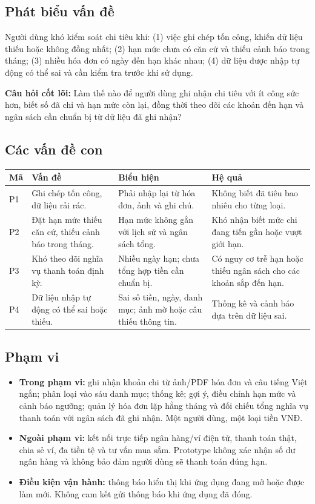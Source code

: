 \documentclass[11pt,a4paper]{article}
\newcommand{\thead}[1]{\rowcolor{tablehead}#1\\\midrule}
\begin{document}
\subsection{Phát biểu vấn đề}
Người dùng khó kiểm soát chi tiêu khi: (1) việc ghi chép tốn công, khiến dữ liệu thiếu hoặc không đồng nhất; (2) hạn mức chưa có căn cứ và thiếu cảnh báo trong tháng; (3) nhiều hóa đơn có ngày đến hạn khác nhau; (4) dữ liệu được nhập tự động có thể sai và cần kiểm tra trước khi sử dụng.

\textbf{Câu hỏi cốt lõi:} Làm thế nào để người dùng ghi nhận chi tiêu với ít công sức hơn, biết số đã chi và hạn mức còn lại, đồng thời theo dõi các khoản đến hạn và ngân sách cần chuẩn bị từ dữ liệu đã ghi nhận?

\subsection{Các vấn đề con}
\begin{longtable}{@{}P{.7cm}P{5.1cm}P{5.1cm}P{4.2cm}@{}}
\toprule\thead{\textbf{Mã}&\textbf{Vấn đề}&\textbf{Biểu hiện}&\textbf{Hệ quả}}
\endhead
P1&Ghi chép tốn công, dữ liệu rải rác.&Phải nhập lại từ hóa đơn, ảnh và ghi chú.&Không biết đã tiêu bao nhiêu cho từng loại.\\\midrule
P2&Đặt hạn mức thiếu căn cứ, thiếu cảnh báo trong tháng.&Hạn mức không gắn với lịch sử và ngân sách tổng.&Khó nhận biết mức chi đang tiến gần hoặc vượt giới hạn.\\\midrule
P3&Khó theo dõi nghĩa vụ thanh toán định kỳ.&Nhiều ngày hạn; chưa tổng hợp tiền cần chuẩn bị.&Có nguy cơ trễ hạn hoặc thiếu ngân sách cho các khoản sắp đến hạn.\\\midrule
P4&Dữ liệu nhập tự động có thể sai hoặc thiếu.&Sai số tiền, ngày, danh mục; ảnh mờ hoặc câu thiếu thông tin.&Thống kê và cảnh báo dựa trên dữ liệu sai.\\\bottomrule
\end{longtable}

\subsection{Phạm vi}
\begin{itemize}
\item \textbf{Trong phạm vi:} ghi nhận khoản chi từ ảnh/PDF hóa đơn và câu tiếng Việt ngắn; phân loại vào sáu danh mục; thống kê; gợi ý, điều chỉnh hạn mức và cảnh báo ngưỡng; quản lý hóa đơn lặp hằng tháng và đối chiếu tổng nghĩa vụ thanh toán với ngân sách đã ghi nhận. Một người dùng, một loại tiền VNĐ.
\item \textbf{Ngoài phạm vi:} kết nối trực tiếp ngân hàng/ví điện tử, thanh toán thật, chia sẻ ví, đa tiền tệ và tư vấn mua sắm. Prototype không xác nhận số dư ngân hàng và không bảo đảm người dùng sẽ thanh toán đúng hạn.
\item \textbf{Điều kiện vận hành:} thông báo hiển thị khi ứng dụng đang mở hoặc được làm mới. Không cam kết gửi thông báo khi ứng dụng đã đóng.
\end{itemize}
\end{document}
